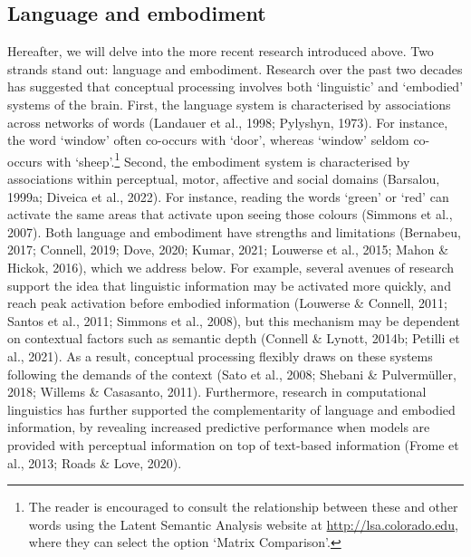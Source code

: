\documentclass[
  12pt,
  man,floatsintext]{apa7}
\begin{document}
\hypertarget{language-and-embodiment}{%
\subsection{Language and embodiment}\label{language-and-embodiment}}

Hereafter, we will delve into the more recent research introduced above. Two strands stand out: language and embodiment. Research over the past two decades has suggested that conceptual processing involves both `linguistic' and `embodied' systems of the brain. First, the language system is characterised by associations across networks of words (Landauer et al., 1998; Pylyshyn, 1973). For instance, the word `window' often co-occurs with `door', whereas `window' seldom co-occurs with `sheep'.\footnote{The reader is encouraged to consult the relationship between these and other words using the Latent Semantic Analysis website at \url{http://lsa.colorado.edu}, where they can select the option `Matrix Comparison'.} Second, the embodiment system is characterised by associations within perceptual, motor, affective and social domains (Barsalou, 1999a; Diveica et al., 2022). For instance, reading the words `green' or `red' can activate the same areas that activate upon seeing those colours (Simmons et al., 2007). Both language and embodiment have strengths and limitations (Bernabeu, 2017; Connell, 2019; Dove, 2020; Kumar, 2021; Louwerse et al., 2015; Mahon \& Hickok, 2016), which we address below. For example, several avenues of research support the idea that linguistic information may be activated more quickly, and reach peak activation before embodied information (Louwerse \& Connell, 2011; Santos et al., 2011; Simmons et al., 2008), but this mechanism may be dependent on contextual factors such as semantic depth (Connell \& Lynott, 2014b; Petilli et al., 2021). As a result, conceptual processing flexibly draws on these systems following the demands of the context (Sato et al., 2008; Shebani \& Pulvermüller, 2018; Willems \& Casasanto, 2011). Furthermore, research in computational linguistics has further supported the complementarity of language and embodied information, by revealing increased predictive performance when models are provided with perceptual information on top of text-based information (Frome et al., 2013; Roads \& Love, 2020).
\end{document}
